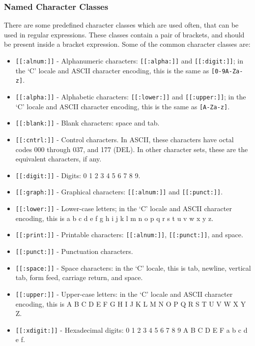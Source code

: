 \subsubsection{Named Character Classes}

There are some predefined character classes which are used often, that can be used in regular expressions. These classes contain a pair of brackets, and should be
present inside a bracket expression. Some of the common character classes are:

\begin{itemize}
  \item \lstinline|[[:alnum:]]| - Alphanumeric characters: \lstinline|[[:alpha:]]| and \lstinline|[[:digit:]]|; in the ‘C’ locale and ASCII character encoding, this is the same as \lstinline|[0-9A-Za-z]|.
  \item \lstinline|[[:alpha:]]| - Alphabetic characters: \lstinline|[[:lower:]]| and \lstinline|[[:upper:]]|; in the ‘C’ locale and ASCII character encoding, this is the same as \lstinline|[A-Za-z]|.
  \item \lstinline|[[:blank:]]| - Blank characters: space and tab.
  \item \lstinline|[[:cntrl:]]| - Control characters. In ASCII, these characters have octal codes 000 through 037, and 177 (DEL). In other character sets, these are the equivalent characters, if any.
  \item \lstinline|[[:digit:]]| - Digits: 0 1 2 3 4 5 6 7 8 9.
  \item \lstinline|[[:graph:]]| - Graphical characters: \lstinline|[[:alnum:]]| and \lstinline|[[:punct:]]|.
  \item \lstinline|[[:lower:]]| - Lower-case letters; in the ‘C’ locale and ASCII character encoding, this is a b c d e f g h i j k l m n o p q r s t u v w x y z.
  \item \lstinline|[[:print:]]| - Printable characters: \lstinline|[[:alnum:]]|, \lstinline|[[:punct:]]|, and space.
  \item \lstinline|[[:punct:]]| - Punctuation characters.
  \item \lstinline|[[:space:]]| - Space characters: in the ‘C’ locale, this is tab, newline, vertical tab, form feed, carriage return, and space.
  \item \lstinline|[[:upper:]]| - Upper-case letters: in the ‘C’ locale and ASCII character encoding, this is A B C D E F G H I J K L M N O P Q R S T U V W X Y Z.
  \item \lstinline|[[:xdigit:]]| - Hexadecimal digits: 0 1 2 3 4 5 6 7 8 9 A B C D E F a b c d e f.
\end{itemize}

